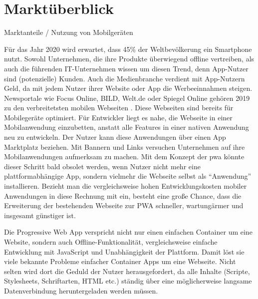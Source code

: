 \section{Marktüberblick}

Marktanteile / Nutzung von Mobilgeräten

Für das Jahr 2020 wird erwartet, dass 45\% der Weltbevölkerung ein Smartphone nutzt.
\cite{StatistaSmartphonesWorldwide}
\cite{StatistaWorldPopulation}
Sowohl Unternehmen, die ihre Produkte überwiegend offline vertreiben, als auch die führenden IT-Unternehmen wissen um diesen Trend, denn App-Nutzer sind (potenzielle) Kunden. Auch die Medienbranche verdient mit App-Nutzern Geld, da mit jedem Nutzer ihrer Website oder App die Werbeeinnahmen steigen. 
Newsportale wie Focus Online, BILD, Welt.de oder Spiegel Online gehören 2019 zu den verbreitetsten mobilen Webseiten \cite{StatistaMobileWebsiteNetReach2019}. Diese  Webseiten sind bereits für Mobilegeräte optimiert. Für Entwickler liegt es nahe, die Webseite in einer Mobilanwendung einzubetten, anstatt alle Features in einer nativen Anwendung neu zu entwickeln. Der Nutzer kann diese Anwendungen über einen App Marktplatz beziehen. Mit Bannern und Links versuchen Unternehmen auf ihre Mobilanwendungen aufmerksam zu machen.
Mit dem Konzept der \ac{pwa} könnte dieser Schritt bald obsolet werden, wenn Nutzer nicht mehr eine plattformabhängige App, sondern vielmehr die Webseite selbst als ``Anwendung'' installieren. Bezieht man die vergleichsweise hohen Entwicklungskosten mobiler Anwendungen in diese Rechnung mit ein, besteht eine große Chance, dass die Erweiterung der bestehenden Webseite zur PWA schneller, wartungärmer und insgesamt günstiger ist.

Die Progressive Web App verspricht nicht nur einen einfachen Container um eine Website, sondern auch Offline-Funktionalität, vergleichsweise einfache Entwicklung mit JavaScript und Unabhängigkeit der Plattform. Damit löst sie viele bekannte Probleme einfacher Container Apps um eine Webseite. Nicht selten wird dort die Geduld der Nutzer herausgefordert, da alle Inhalte (Scripte, Stylesheets, Schriftarten, HTML etc.) ständig über eine möglicherweise langsame Datenverbindung heruntergeladen werden müssen.

